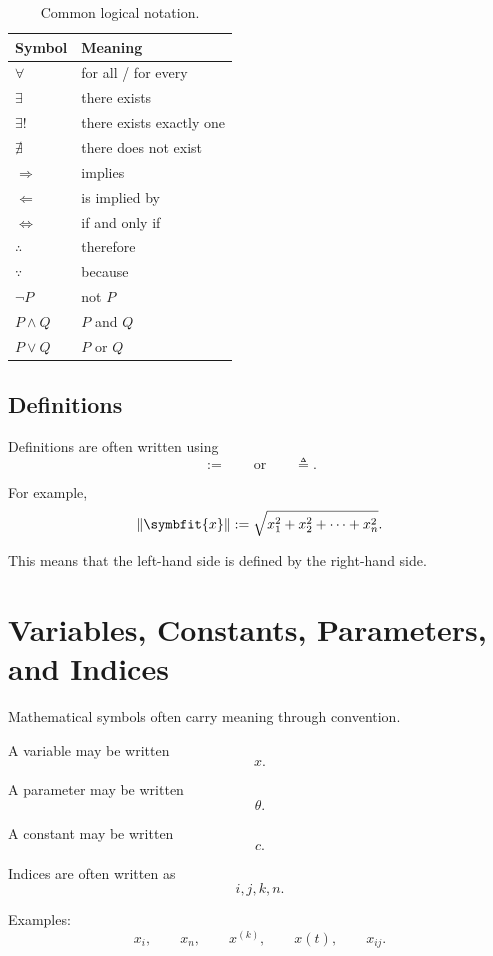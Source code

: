 \documentclass[11pt,twocolumn]{article}
\newcommand{\vct}[1]{\symbfit{#1}}   %
\newcommand{\norm}[1]{\left\lVert #1 \right\rVert}
\newcommand{\definedas}{\mathrel{:=}}
\newcommand{\definedasalt}{\mathrel{\triangleq}}
\begin{document}
\begin{table}[ht]
\centering
\caption{Common logical notation.}
\begin{tabular}{ll}
\toprule
Symbol & Meaning \\
\midrule
$\forall$ & for all / for every \\
$\exists$ & there exists \\
$\exists!$ & there exists exactly one \\
$\nexists$ & there does not exist \\
$\Rightarrow$ & implies \\
$\Leftarrow$ & is implied by \\
$\Leftrightarrow$ & if and only if \\
$\therefore$ & therefore \\
$\because$ & because \\
$\neg P$ & not \(P\) \\
$P \land Q$ & \(P\) and \(Q\) \\
$P \lor Q$ & \(P\) or \(Q\) \\
\bottomrule
\end{tabular}
\end{table}

\subsection{Definitions}

Definitions are often written using
\[
\definedas
\qquad
\text{or}
\qquad
\definedasalt.
\]

For example,
\[
\norm{\vct{x}}
\definedas
\sqrt{x_1^2+x_2^2+\cdots+x_n^2}.
\]

This means that the left-hand side is defined by the right-hand side.

\section{Variables, Constants, Parameters, and Indices}

Mathematical symbols often carry meaning through convention.

A variable may be written
\[
x.
\]

A parameter may be written
\[
\theta.
\]

A constant may be written
\[
c.
\]

Indices are often written as
\[
i,j,k,n.
\]

Examples:
\[
x_i,
\qquad
x_n,
\qquad
x^{(k)},
\qquad
x(t),
\qquad
x_{ij}.
\]
\end{document}
